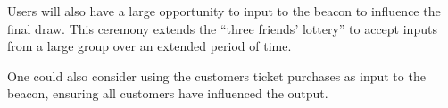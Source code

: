 Users will also have a large opportunity to input to the beacon to influence the final draw.
This ceremony extends the \enquote{three friends' lottery} to accept inputs from a large group over an extended period of time.

One could also consider using the customers ticket purchases as input to the beacon, ensuring all customers have influenced the output.
